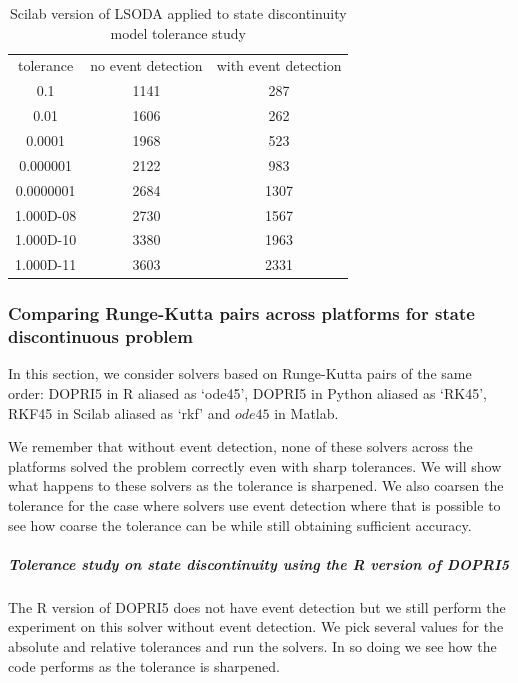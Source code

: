 \begin{table}[h]
\caption {Scilab version of LSODA applied to state discontinuity model tolerance study} \label{tab:tolerance_state_discontinuity_lsoda_scilab} 
\begin{center}
\begin{tabular}{ c c c }
tolerance & no event detection & with event detection \\
0.1 & 1141 & 287 \\
0.01 & 1606 & 262 \\
0.0001 & 1968 & 523 \\
0.000001 & 2122 & 983 \\
0.0000001 & 2684 & 1307 \\
1.000D-08 & 2730 & 1567 \\
1.000D-10 & 3380 & 1963 \\
1.000D-11 & 3603 & 2331 \\
\end{tabular}
\end{center}
\end{table}

\subsubsection{Comparing Runge-Kutta pairs across platforms for state discontinuous problem}
In this section, we consider solvers based on Runge-Kutta pairs of the same order: DOPRI5 in R aliased as `ode45', DOPRI5 in Python aliased as `RK45', RKF45 in Scilab aliased as `rkf' and $ode45$ in Matlab.

We remember that without event detection, none of these solvers across the platforms solved the problem correctly even with sharp tolerances. We will show what happens to these solvers as the tolerance is sharpened. We also coarsen the tolerance for the case where solvers use event detection where that is possible to see how coarse the tolerance can be while still obtaining sufficient accuracy.

\subparagraph{Tolerance study on state discontinuity using the R version of DOPRI5}
The R version of DOPRI5 does not have event detection but we still perform the experiment on this solver without event detection. We pick several values for the absolute and relative tolerances and run the solvers. In so doing we see how the code performs as the tolerance is sharpened. 

